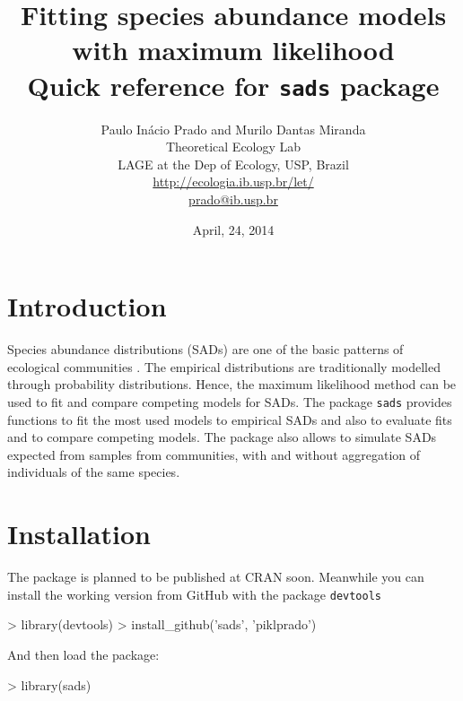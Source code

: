 \documentclass[11pt, A4]{article}
\newcommand{\code}[1]{\texttt{#1}}
\begin{document}
\title{Fitting species abundance models with maximum likelihood \\ Quick reference for \code{sads} package}
\author{Paulo In\'acio Prado and  Murilo Dantas Miranda \\ Theoretical Ecology Lab \\ LAGE at the Dep of Ecology, USP, Brazil \\ 
  \url{http://ecologia.ib.usp.br/let/} \\ \url{prado@ib.usp.br}}

\date{April, 24, 2014}

\maketitle



\section{Introduction}

Species abundance distributions (SADs) are one of the basic patterns
of ecological communities \citep{McGill2007}. 
The empirical distributions are
traditionally modelled through probability distributions. Hence, the
maximum likelihood method can be used to fit and compare competing
models for SADs. 
The package \code{sads} provides functions to fit the most used models
to empirical SADs and also to evaluate fits and to compare competing
models. The package also allows to simulate SADs expected from samples
from communities, with and without aggregation of individuals of the
same species.


\section{Installation}

The package is planned to be published at CRAN soon. Meanwhile you can install the working version
from GitHub with the package \code{devtools}

\begin{Schunk}
\begin{Sinput}
> library(devtools)
> install_github('sads', 'piklprado')
\end{Sinput}
\end{Schunk}


And then load the package:

\begin{Schunk}
\begin{Sinput}
> library(sads)
\end{Sinput}
\end{Schunk}
\end{document}
